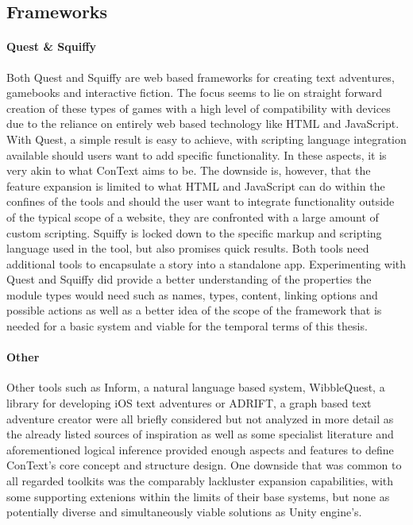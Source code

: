 \subsection{Frameworks}
\paragraph{Quest \& Squiffy} %
Both Quest and Squiffy are web based frameworks for creating text adventures, gamebooks and interactive fiction. The focus seems to lie on straight forward creation of these types of games with a high level of compatibility with devices due to the reliance on entirely web based technology like HTML and JavaScript. With Quest, a simple result is easy to achieve, with scripting language integration available should users want to add specific functionality. In these aspects, it is very akin to what ConText aims to be. The downside is, however, that the feature expansion is limited to what HTML and JavaScript can do within the confines of the tools and should the user want to integrate functionality outside of the typical scope of a website, they are confronted with a large amount of custom scripting. 
Squiffy is locked down to the specific markup and scripting language used in the tool, but also promises quick results.
Both tools need additional tools to encapsulate a story into a standalone app. 
Experimenting with Quest and Squiffy did provide a better understanding of the properties the module types would need such as names, types, content, linking options and possible actions as well as a better idea of the scope of the framework that is needed for a basic system and viable for the temporal terms of this thesis.
\paragraph{Other}
Other tools such as Inform, a natural language based system, WibbleQuest, a library for developing iOS text adventures or ADRIFT, a graph based text adventure creator were all briefly considered but not analyzed in more detail as the already listed sources of inspiration as well as some specialist literature and aforementioned logical inference provided enough aspects and features to define ConText's core concept and structure design. 
One downside that was common to all regarded toolkits was the comparably lackluster expansion capabilities, with some supporting extenions within the limits of their base systems, but none as potentially diverse and simultaneously viable solutions as Unity engine's.

